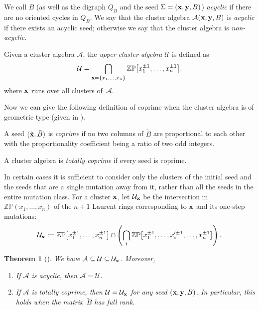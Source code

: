\documentclass[pdftex]{sigma}
\numberwithin{equation}{section}
\newtheorem{Theorem}{Theorem}[section]
\begin{document}
 We call $B$ (as well as the digraph $Q_B$ and the seed $\Sigma=({\bf x},{\bf y},B)$) \emph{acyclic} if there are no oriented cycles in $Q_B$.
We say that the cluster algebra $\mathcal{A}({\bf x},{\bf y},B)$ is \emph{acyclic} if there exists an acyclic seed; otherwise we say that the cluster algebra is \emph{non-acyclic}.

\begin{Definition}
Given a cluster algebra $\mathcal{A}$, the \emph{upper cluster algebra} $\mathcal{U}$ is def\/ined as
\begin{gather*}
 \mathcal{U} =
 \bigcap_{{\bf x}=\{x_1,\ldots,x_n\}}
  \mathbb{ZP}\big[x_1^{\pm 1},\ldots,x_n^{\pm 1}\big],
\end{gather*}
where ${\bf x}$ runs over all clusters of~$\mathcal{A}$.
\end{Definition}

Now we can give the following def\/inition of coprime when the cluster algebra is of geometric type (given in \cite[Lemma~3.1]{BFZ}).

\begin{Definition}
A seed  $(\tilde{\bf x},\tilde{B})$ is \emph{coprime} if no two columns of $\tilde{B}$ are proportional to each other with the proportionality coef\/f\/icient being a ratio of two odd integers.

A cluster algebra is \emph{totally coprime} if every seed is coprime.
\end{Definition}


In certain cases it is suf\/f\/icient to consider only the clusters of the initial seed and the seeds that are a single mutation away from it, rather than all the seeds in the entire mutation class.
For a cluster ${\bf x}$,  let $\mathcal{U}_{{\bf x}}$ be the intersection in $\mathbb{ZP}(x_1,\ldots,x_n)$ of the $n+1$ Laurent rings corresponding to ${\bf x}$ and its one-step mutations:
\begin{gather*}
\mathcal{U}_{\bf x} := \mathbb{ZP}\big[x_1^{\pm 1},\ldots, x_n^{\pm 1}\big] \cap \left(\bigcap_i \mathbb{ZP}\big[x_1^{\pm 1},\ldots,x_i'^{\pm 1},\ldots, x_n^{\pm 1}\big]\right).
\end{gather*}

\begin{Theorem}[\cite{BFZ,M}]\label{UB}
We have
 $\mathcal{A}\subseteq\mathcal{U}\subseteq\mathcal{U}_{\bf x}$. Moreover,
\begin{enumerate}\itemsep=0pt
\item[$(i)$] If $\mathcal{A}$ is acyclic, then $\mathcal{A}=\mathcal{U}$.

\item[$(ii)$] If $\mathcal{A}$ is totally coprime, then $\mathcal{U}=\mathcal{U}_{{\bf x}}$ for any seed $({\bf x},{\bf y},B)$. In particular, this holds when the matrix~$\tilde{B}$ has full rank.
\end{enumerate}
\end{Theorem}
\end{document}
